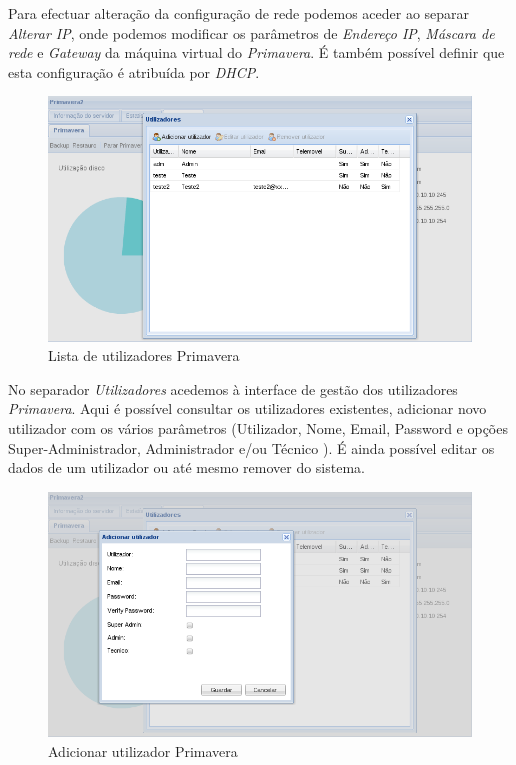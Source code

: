 Para efectuar alteração da configuração de rede podemos aceder ao separar \textit{Alterar IP}, onde podemos modificar os parâmetros de \textit{Endereço IP}, \textit{Máscara de rede} e \textit{Gateway} da máquina virtual do \textit{Primavera}. É também possível definir que esta configuração é atribuída por \textit{DHCP}.

\begin{figure}[H]
    \begin{center}
    \includegraphics[scale=0.38]{screenshots/primavera/primaverainterface_07.png}
    \caption{Lista de utilizadores Primavera}
    \label{fig:primavera_list_users}
    \end{center}
\end{figure}

No separador \textit{Utilizadores} acedemos à interface de gestão dos utilizadores \textit{Primavera}.
Aqui é possível consultar os utilizadores existentes, adicionar novo utilizador com os vários parâmetros (Utilizador, Nome, Email, Password e opções Super-Administrador, Administrador e/ou Técnico ). É ainda possível editar os dados de um utilizador ou até mesmo remover do sistema.

\begin{figure}[H]
    \begin{center}
    \includegraphics[scale=0.38]{screenshots/primavera/primaverainterface_08.png}
    \caption{Adicionar utilizador Primavera}
    \label{fig:primavera_add_user}
    \end{center}
\end{figure}

